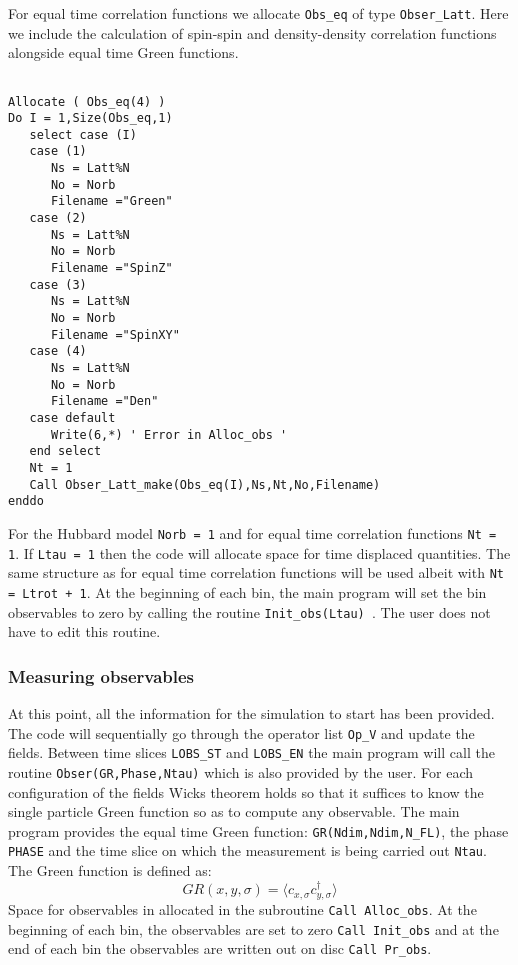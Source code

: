 For equal time correlation  functions  we allocate  \texttt{Obs\_eq}  of type \texttt{Obser\_Latt}.  Here we include the calculation of spin-spin and density-density correlation functions alongside equal time Green functions. 
\begin{lstlisting}

Allocate ( Obs_eq(4) )
Do I = 1,Size(Obs_eq,1)
   select case (I)
   case (1)
      Ns = Latt%N
      No = Norb
      Filename ="Green"
   case (2)
      Ns = Latt%N
      No = Norb
      Filename ="SpinZ"
   case (3)
      Ns = Latt%N
      No = Norb
      Filename ="SpinXY"
   case (4)
      Ns = Latt%N
      No = Norb
      Filename ="Den"
   case default
      Write(6,*) ' Error in Alloc_obs '  
   end select
   Nt = 1
   Call Obser_Latt_make(Obs_eq(I),Ns,Nt,No,Filename)
enddo
 \end{lstlisting} 
 For the Hubbard model \texttt{Norb = 1} and for   equal time correlation functions   \texttt{Nt = 1}.       If  \texttt{Ltau = 1}  then the code will allocate space for  time displaced quantities.   The same structure as for  equal time correlation functions will be used albeit with  \texttt{Nt = Ltrot + 1}.  At the beginning of each bin, the main program will set the bin observables to zero by calling  the routine 
 \texttt{Init\_obs(Ltau) }.   The user does not have to edit this routine. 
 
\subsubsection{Measuring observables}
At this point, all the information   for the simulation to  start has been provided.  The code will sequentially go through  the operator list  \texttt{Op\_V}  and update the  fields.   Between  time slices   \texttt{LOBS\_ST}  and 
\texttt{LOBS\_EN}   the main program will call the routine  \texttt{Obser(GR,Phase,Ntau)}   which is also provided by the user.  For each configuration of the  fields Wicks theorem holds so that it suffices 
to  know the single particle Green function so as to compute  any observable. 
The main program provides the  equal time Green function: 
\texttt{GR(Ndim,Ndim,N\_FL)}, the phase \texttt{PHASE} and the time slice on which the measurement is being carried out \texttt{Ntau}.   The Green function is defined as: 
\begin{equation}
	 GR(x,y,\sigma)  = \langle c^{\phantom{\dagger}}_{x,\sigma} c^{\dagger}_{y,\sigma}  \rangle
\end{equation}
Space for observables in allocated in the  subroutine \texttt{Call Alloc\_obs}. At the beginning of each bin, the  observables are set to zero \texttt{Call Init\_obs} and at the end of each bin the observables are written out on disc \texttt{Call Pr\_obs}.



